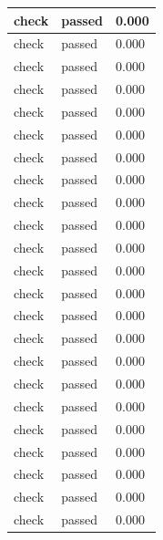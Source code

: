 \documentclass[11pt,a4paper]{article}
\begin{document}
{\begin{longtable}{@{}L{0.57\textwidth}|L{0.16\textwidth}|L{0.17\textwidth}@{}}
check & passed & 0.000\\[2pt]\hline

check & passed & 0.000\\[2pt]\hline

check & passed & 0.000\\[2pt]\hline

check & passed & 0.000\\[2pt]\hline

check & passed & 0.000\\[2pt]\hline

check & passed & 0.000\\[2pt]\hline

check & passed & 0.000\\[2pt]\hline

check & passed & 0.000\\[2pt]\hline

check & passed & 0.000\\[2pt]\hline

check & passed & 0.000\\[2pt]\hline

check & passed & 0.000\\[2pt]\hline

check & passed & 0.000\\[2pt]\hline

check & passed & 0.000\\[2pt]\hline

check & passed & 0.000\\[2pt]\hline

check & passed & 0.000\\[2pt]\hline

check & passed & 0.000\\[2pt]\hline

check & passed & 0.000\\[2pt]\hline

check & passed & 0.000\\[2pt]\hline

check & passed & 0.000\\[2pt]\hline

check & passed & 0.000\\[2pt]\hline

check & passed & 0.000\\[2pt]\hline

check & passed & 0.000\\[2pt]\hline

check & passed & 0.000\\[2pt]\hline


\end{longtable}}
\end{document}

